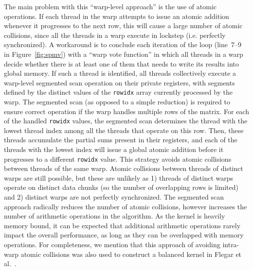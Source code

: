 The main problem with this ``warp-level approach'' is the use of atomic operations.
If each thread in the warp attempts to issue an atomic addition whenever it
progresses to the next row, this will cause a large number of atomic
collisions, since all the threads in a warp execute in lockstep (i.e. perfectly
synchronized).
A workaround is to conclude each iteration of the loop (line~7--9 in Figure~\ref{fig:spmv})
with a ``warp vote function'' in which all threads in a warp 
decide whether there is at least one of them that needs to
write its results into global memory.
If such a thread is identified, all threads collectively execute a
warp-level segmented scan operation on their private registers, with segments
defined by the distinct values of the \texttt{rowidx} array currently processed by
the warp.
The segmented scan (as opposed to a simple reduction) is required to
ensure correct operation if the warp handles multiple rows of the matrix.
For each of the handled \texttt{rowidx} values, the segmented scan determines
the thread with the lowest thread index among all the threads that operate on
this row.
Then, these threads accumulate the partial sums present in their registers,
and each of the threads with the lowest index will issue a global
atomic addition before it progresses to a different \texttt{rowidx} value.
This strategy avoids atomic collisions between threads of the same warp.
Atomic collisions between threads of distinct warps are still
possible, but these are unlikely as 
1) threads of distinct warps operate on distinct data chunks (so the number of
overlapping rows is limited) and
2) distinct warps are not perfectly synchronized.
The segmented scan approach radically reduces the number of atomic collisions, 
however increases the number of arithmetic operations in the algorithm.
As the \spmv kernel is heavily memory bound, it can be expected that 
additional arithmetic operations rarely impact the overall performance,
as long as they can be overlapped with memory operations.
For completeness, we mention that this approach of avoiding intra-warp
atomic collisions was also used to construct a balanced \csr \spmv kernel in
Flegar et al.~\cite{csri}.

